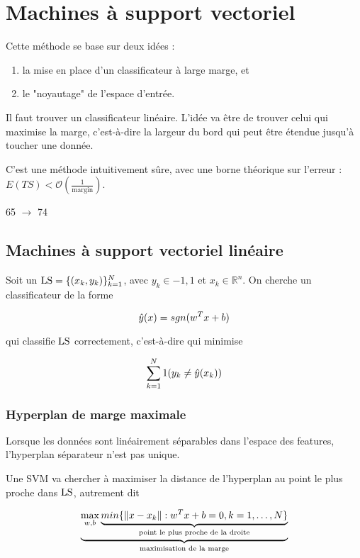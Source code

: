 \chapter{Machines à support vectoriel}

Cette méthode se base sur deux idées :

\begin{enumerate}
	\item la mise en place d'un classificateur à large marge, et
	\item le "noyautage" de l'espace d'entrée.
\end{enumerate}

Il faut trouver un classificateur linéaire. L'idée va être de trouver celui qui maximise la marge, c'est-à-dire la largeur du bord qui peut être étendue jusqu'à toucher une donnée.


C'est une méthode intuitivement sûre, avec une borne théorique sur l'erreur : $E(TS) < \mathcal{O}(\frac{1}{\text{margin}})$.

65 $\rightarrow$ 74

\section{Machines à support vectoriel linéaire}
	
	Soit un $\text{LS} = \lbrace (x_k, y_k) \rbrace^N_{k = 1}$, avec $y_k \in {-1, 1}$ et $x_k \in \mathbb{R}^n$. On cherche un classificateur de la forme
	
	$$\hat{y}(x) = sgn(w^T x + b)$$
	
	qui classifie $\text{LS}$ correctement, c'est-à-dire qui minimise
	
	$$\sum_{k = 1}^N1(y_k \neq \hat{y}(x_k))$$
	
	
	\subsection{Hyperplan de marge maximale}
	
	Lorsque les données sont linéairement séparables dans l'espace des features, l'hyperplan séparateur n'est pas unique.
	
	
	Une SVM va chercher à maximiser la distance de l'hyperplan au point le plus proche dans $\text{LS}$, autrement dit
	
	$$\underbrace{\max_{w, b} \underbrace{min \lbrace \Vert x - x_k \Vert : w^T x + b = 0, k = 1, \dots , N \rbrace}_{\text{point le plus proche de la droite}}}_{\text{maximisation de la marge}}$$
	
